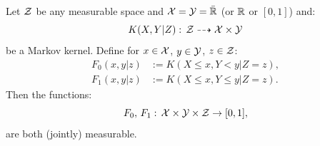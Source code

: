 \begin{Exc}
    \label{ccdf-measurable}
    Let $\mathcal{Z}$ be any measurable space and $\mathcal{X}=\mathcal{Y}=\bar{\mathbb{R}}$ (or $\mathbb{R}$ or $[0,1]$) and:
    \[ K(X,Y|Z):\, \mathcal{Z} \dashrightarrow \mathcal{X} \times \mathcal{Y} \]
    be a Markov kernel. Define for $x \in \mathcal{X}$, $y \in \mathcal{Y}$, $z \in \mathcal{Z}$:
    \begin{align*}
        F_0(x,y|z) &:= K(X \le x, Y< y|Z=z),\\
        F_1(x,y|z) &:= K(X \le x, Y\le y|Z=z).
    \end{align*}
    Then the functions:
    \[ F_0,\,F_1:\, \mathcal{X} \times \mathcal{Y} \times \mathcal{Z} \to [0,1],\]
    are both (jointly) measurable.
\end{Exc}

